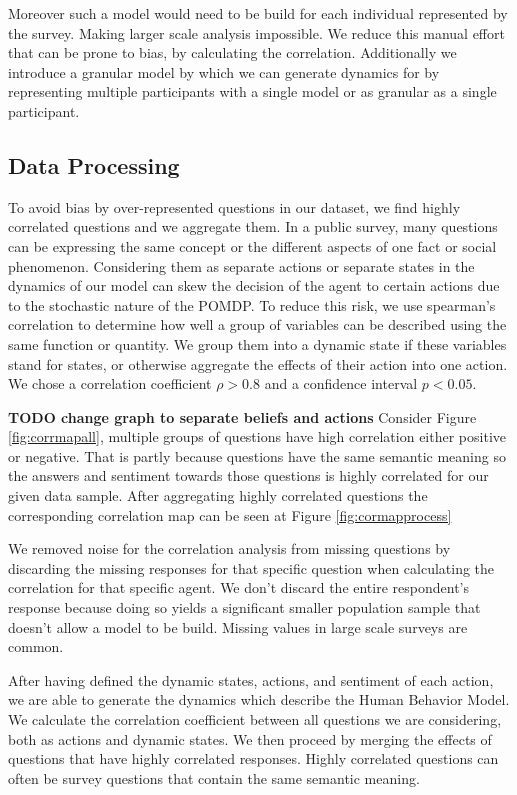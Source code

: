 {Moreover such a model would need to be build for each individual represented by the survey. Making larger scale analysis impossible. We reduce this manual effort that can be prone to bias, by calculating the correlation. Additionally we introduce a granular model by which we can generate dynamics for by representing multiple participants with a single model or as granular as a single participant.

\subsection{Data Processing}


To avoid bias by over-represented questions in our dataset, we find highly correlated questions and we aggregate them. In a public survey, many questions can be expressing the same concept or the different aspects of one fact or social phenomenon. Considering them as separate actions or separate states in the dynamics of our model can skew the decision of the agent to certain actions due to the stochastic nature of the POMDP. To reduce this risk, we use spearman's correlation to determine how well a group of variables can be described using the same function or quantity. We group them into a dynamic state if these variables stand for states, or otherwise aggregate the effects of their action into one action. We chose a correlation coefficient $\rho>0.8$ and a confidence interval $p<0.05$.  

\textbf{TODO change graph to separate beliefs and actions}
Consider Figure \ref{fig:corrmapall}, multiple groups of questions have high correlation either positive or negative. That is partly because questions have the same semantic meaning so the answers and sentiment towards those questions is highly correlated for our given data sample. After aggregating highly correlated questions the corresponding correlation map can be seen at Figure \ref{fig:cormapprocess}



We removed noise for the correlation analysis from missing questions by discarding the missing responses for that specific question when calculating the correlation for that specific agent. We don't discard the entire respondent's response because doing so yields a significant smaller population sample that doesn't allow a model to be build. Missing values in large scale surveys are common. 

After having defined the dynamic states, actions, and sentiment of each action, we are able to generate the dynamics which describe the Human Behavior Model. We calculate the correlation coefficient between all questions we are considering, both as actions and dynamic states. We then proceed by merging the effects of questions that have highly correlated responses. Highly correlated questions can often be survey questions that contain the same semantic meaning.  



}
